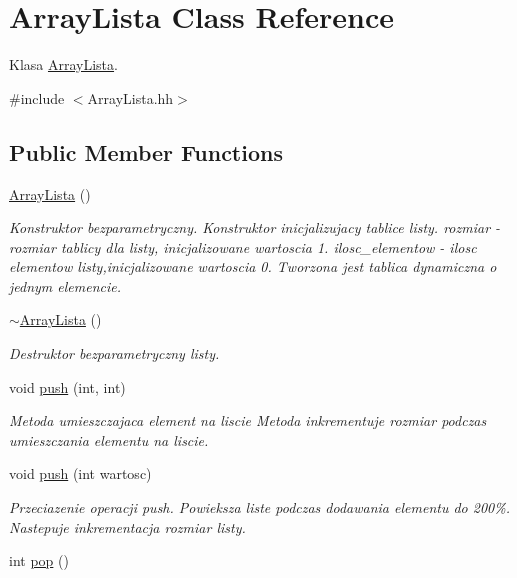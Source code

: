\hypertarget{a00001}{}\section{Array\+Lista Class Reference}
\label{a00001}


Klasa \hyperlink{a00001}{Array\+Lista}.  




{\ttfamily \#include $<$Array\+Lista.\+hh$>$}

\subsection*{Public Member Functions}
\begin{DoxyCompactItemize}
\item 
\hyperlink{a00001_a645d18dcf43d2f3397d0ba90f5d8d0b4}{Array\+Lista} ()
\begin{DoxyCompactList}\small\item\em Konstruktor bezparametryczny. Konstruktor inicjalizujacy tablice listy. rozmiar -\/ rozmiar tablicy dla listy, inicjalizowane wartoscia 1. ilosc\+\_\+elementow -\/ ilosc elementow listy,inicjalizowane wartoscia 0. Tworzona jest tablica dynamiczna o jednym elemencie. \end{DoxyCompactList}\item 
\hyperlink{a00001_ab502f9c0ea71ec66954ebe675100b9ce}{$\sim$\+Array\+Lista} ()
\begin{DoxyCompactList}\small\item\em Destruktor bezparametryczny listy. \end{DoxyCompactList}\item 
void \hyperlink{a00001_a473a71ed888097c7b14bb70cbf7eecd6}{push} (int, int)
\begin{DoxyCompactList}\small\item\em Metoda umieszczajaca element na liscie Metoda inkrementuje rozmiar podczas umieszczania elementu na liscie. \end{DoxyCompactList}\item 
void \hyperlink{a00001_a1d194e2d2e54114ef939d7fe64508840}{push} (int wartosc)
\begin{DoxyCompactList}\small\item\em Przeciazenie operacji push. Powieksza liste podczas dodawania elementu do 200\%. Nastepuje inkrementacja rozmiar listy. \end{DoxyCompactList}\item 
int \hyperlink{a00001_ae76ea59ccac91abd264cf108489d3105}{pop} ()

\end{DoxyCompactItemize}
